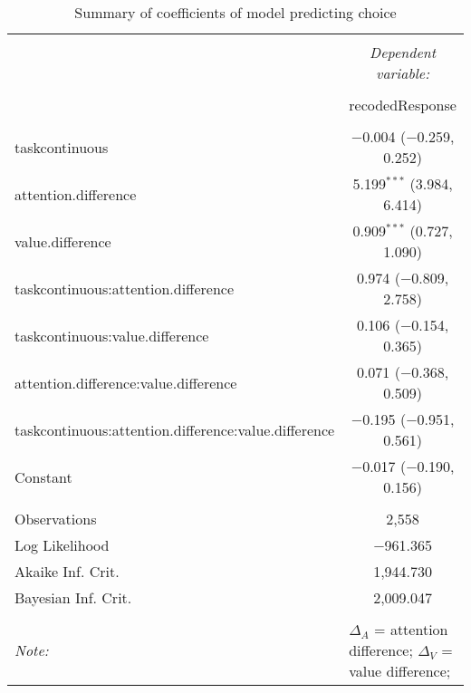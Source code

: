 
\begin{table}[!b] \centering 
  \caption{Summary of coefficients of model predicting choice} 
  \label{table:choiceModel} 
\begin{tabular}{@{\extracolsep{5pt}}lc} 
\\[-1.8ex]\hline 
\hline \\[-1.8ex] 
 & \multicolumn{1}{c}{\textit{Dependent variable:}} \\ 
\cline{2-2} 
\\[-1.8ex] & recodedResponse \\ 
\hline \\[-1.8ex] 
 taskcontinuous & $-$0.004 ($-$0.259, 0.252) \\ 
  attention.difference & 5.199$^{***}$ (3.984, 6.414) \\ 
  value.difference & 0.909$^{***}$ (0.727, 1.090) \\ 
  taskcontinuous:attention.difference & 0.974 ($-$0.809, 2.758) \\ 
  taskcontinuous:value.difference & 0.106 ($-$0.154, 0.365) \\ 
  attention.difference:value.difference & 0.071 ($-$0.368, 0.509) \\ 
  taskcontinuous:attention.difference:value.difference & $-$0.195 ($-$0.951, 0.561) \\ 
  Constant & $-$0.017 ($-$0.190, 0.156) \\ 
 \hline \\[-1.8ex] 
Observations & 2,558 \\ 
Log Likelihood & $-$961.365 \\ 
Akaike Inf. Crit. & 1,944.730 \\ 
Bayesian Inf. Crit. & 2,009.047 \\ 
\hline 
\hline \\[-1.8ex] 
\textit{Note:}  & \multicolumn{1}{l}{\footnotesize $\Delta_A$ = attention difference; $\Delta_V$ = value difference; } \\ 
\end{tabular} 
\end{table} 
